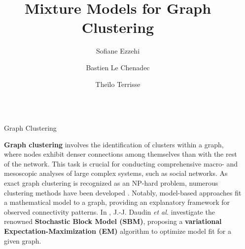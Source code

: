 \documentclass[final]{beamer}
\title{Mixture Models for Graph Clustering}
\author{Sofiane Ezzehi \inst{1} \and Bastien Le Chenadec \inst{1} \and Theïlo Terrisse \inst{1}}
\institute[shortinst]{École des Ponts ParisTech}
\newlength{\sepwidth}
\newlength{\colwidth}
\newcommand{\separatorcolumn}{\begin{column}{\sepwidth}\end{column}}
\begin{document}
\begin{frame}[t]
  \begin{columns}[t]
    \separatorcolumn

    \begin{column}{\colwidth}

      \begin{block}{Graph Clustering}


        \textbf{Graph clustering} involves the identification of clusters within a graph, where nodes exhibit denser connections among themselves than with the rest of the network. This task is crucial for conducting comprehensive macro- and mesoscopic analyses of large complex systems, such as social networks. As exact graph clustering is recognized as an NP-hard problem, numerous clustering methods have been developed \cite{fortunato_community_2010}. Notably, model-based approaches fit a mathematical model to a graph, providing an explanatory framework for observed connectivity patterns. In \cite{main_article}, J.-J. Daudin \textit{et al.} investigate the renowned \textbf{Stochastic Block Model (SBM)}, proposing a \textbf{variational Expectation-Maximization (EM)} algorithm to optimize model fit for a given graph.
      \end{block}


\end{column}
\end{columns}
\end{frame}
\end{document}
